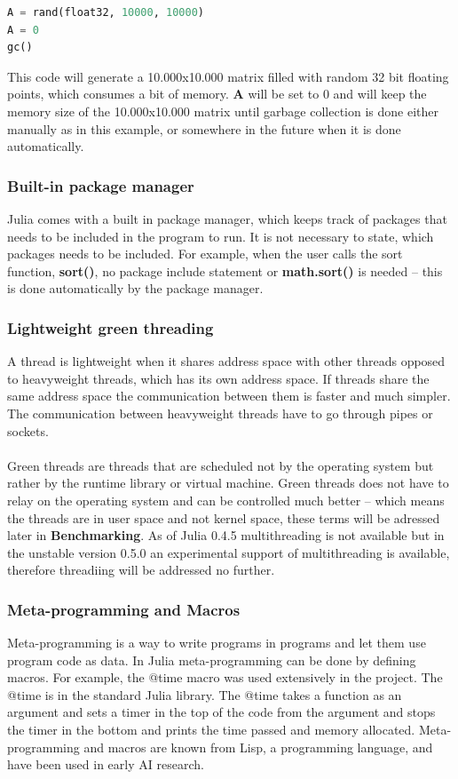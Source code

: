 \documentclass[a4paper, 11pt, titlepage]{article}
\begin{document}
\begin{lstlisting}[language=python]
A = rand(float32, 10000, 10000) 
A = 0
gc() 
\end{lstlisting}
This code will generate a 10.000x10.000 matrix filled with random 32 bit floating points, which consumes a bit of memory. \textbf{A} will be set to 0 and will keep the memory size of the 10.000x10.000 matrix until garbage collection is done either manually as in this example, or somewhere in the future when it is done automatically. 

\subsubsection{Built-in package manager}
Julia comes with a built in package manager, which keeps track of packages that needs to be included in the program to run. It is not necessary to state, which packages needs to be included. For example, when the user calls the sort function, \textbf{sort()}, no package include statement or \textbf{math.sort()} is needed – this is done automatically by the package manager.

\subsubsection{Lightweight green threading}
A thread is lightweight when it shares address space with other threads opposed to heavyweight threads, which has its own address space. If threads share the same address space the communication between them is faster and much simpler. The communication between heavyweight threads have to go through pipes or sockets. \\
\\
Green threads are threads that are scheduled not by the operating system but rather by the runtime library or virtual machine. Green threads does not have to relay on the operating system and can be controlled much better – which means the threads are in user space and not kernel space, these terms will be adressed later in \textbf{Benchmarking}. As of Julia 0.4.5 multithreading is not available but in the unstable version 0.5.0 an experimental support of multithreading is available, therefore threadiing will be addressed no further. 

\subsubsection{Meta-programming and Macros}
Meta-programming is a way to write programs in programs and let them use program code as data. In Julia meta-programming can be done by defining macros. For example, the @time macro was used extensively in the project. The @time is in the standard Julia library. The @time takes a function as an argument and sets a timer in the top of the code from the argument and stops the timer in the bottom and prints the time passed and memory allocated. Meta-programming and macros are known from Lisp, a programming language, and have been used in early AI research. 
\end{document}
